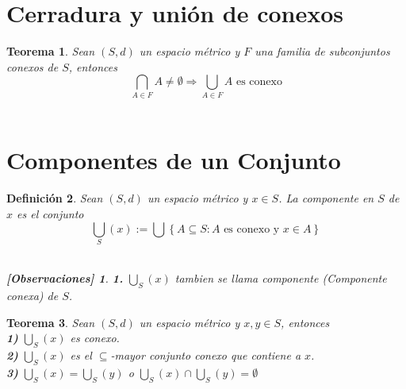 \documentclass[oneside]{book} %
\theoremstyle{Teorema}
\newtheorem{Definicion}{Definición}[chapter]
\newtheorem{Teorema}[Definicion]{Teorema}
\theoremstyle{Ejemplos}
\theoremstyle{[Obs]}
\newtheorem*{Obs}{[Observaciones]}
\renewcommand{\{}{\left\lbrace} %
\renewcommand{\}}{\right\rbrace} %
\newcommand{\n}{\cap} %
\newcommand{\U}{\bigcup} %
\newcommand{\N}{\bigcap} %
\renewcommand{\sc}{\subseteq} %
\begin{document}
		\section{Cerradura y unión de conexos}

			\begin{Teorema}

				Sean $(S, d)$ un espacio métrico y $F$ una familia de subconjuntos conexos de $S$, entonces \\
				
				\[ \N_{A \in F}A \neq \emptyset \Rightarrow \displaystyle\U_{A \in F}A \text{ es conexo} \] \\

			\end{Teorema}

		\section{Componentes de un Conjunto}

			\begin{Definicion}

				Sean $(S, d)$ un espacio métrico y $x \in S$. La componente en $S$ de $x$ es el conjunto \\

				\[ \textstyle\U_{S}(x) := \textstyle\U\{ A \sc S : A \text{ es conexo y } x \in A \} \] \\

				\begin{Obs}
				
					\hfill
				
					\textbf{1.} $\U_{S}(x)$ tambien se llama componente (Componente conexa) de $S$. \\
				
				\end{Obs}

			\end{Definicion}

			\begin{Teorema}

				Sean $(S, d)$ un espacio métrico y $x, y \in S$, entonces \\

				\textbf{1)} $\U_{S}(x)$ es conexo. \\

				\textbf{2)} $\U_{S}(x)$ es el $\sc$-mayor conjunto conexo que contiene a $x$. \\

				\textbf{3)} $\U_{S}(x) = \U_{S}(y)$ o $\U_{S}(x) \n \U_{S}(y) = \emptyset$ \\

			\end{Teorema}
\end{document}
